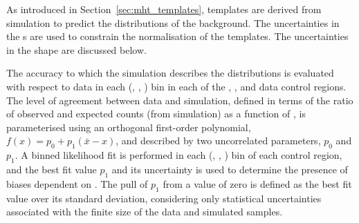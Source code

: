 


As introduced in Section~\ref{sec:mht_templates}, templates are
derived from simulation to predict the \HTmiss distributions of the
background. The uncertainties in the {\tf}s are used to constrain the
normalisation of the \HTmiss templates. The uncertainties in the
\HTmiss shape are discussed below.


The accuracy to which the simulation describes the \HTmiss
distributions is evaluated with respect to data in each (\njet, \nb,
\scalht) bin in each of the \mj, \mmj, and \gj data control regions. %
The level of agreement between data and simulation, defined in terms
of the ratio of observed and expected counts (from simulation) as a
function of \HTmiss, is parameterised using an orthogonal first-order
polynomial, $f(x) = p_0 + p_1(\bar{x}-x)$, and described by two
uncorrelated parameters, $p_0$ and $p_1$. A binned likelihood fit is
performed in each (\njet, \nb, \scalht) bin of each control region,
and the best fit value $p_1$ and its uncertainty is used to determine
the presence of biases dependent on \HTmiss. The pull of $p_1$ from a
value of zero is defined as the best fit value over its standard
deviation, considering only statistical uncertainties associated with
the finite size of the data and simulated samples.

